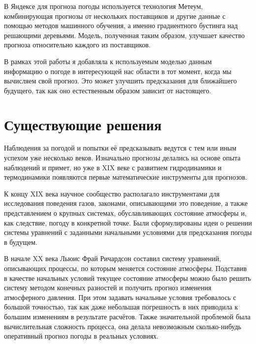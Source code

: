 \documentclass[14pt]{matmex-diploma}
\begin{document}
В Яндексе для прогноза погоды используется технология Метеум, комбинирующая прогнозы от нескольких поставщиков и другие данные с помощью методов машинного обучения, а именно градиентного бустинга над решающими деревьями. Модель, полученная таким образом, улучшает качество прогноза относительно каждого из поставщиков.

В рамках этой работы я добавляла к используемым моделью данным информацию о погоде в интересующей нас области в тот момент, когда мы вычисляем свой прогноз. Это может улучшить предсказания для ближайшего будущего, так как оно естественным образом зависит от настоящего.



\section{Существующие решения}




Наблюдения за погодой и попытки её предсказывать ведутся с тем или иным успехом уже несколько веков. Изначально прогнозы делались на основе опыта наблюдений и примет, но уже в XIX веке с развитием гидродинамики и термодинамики появляются первые математические инструменты для прогнозов. 

К концу XIX века научное сообщество располагало инструментами для исследования поведения газов, законами, описывающими это поведение, а также представлением о крупных системах, обуславливающих состояние атмосферы и, как следствие, погоду в конкретной точке. Были сформулированы идеи о решении системы уравнений с заданными начальными условиями для предсказания погоды в будущем.

В начале XX века Льюис Фрай Ричардсон составил систему уравнений, описывающих процессы, по которым меняется состояние атмосферы. Подставив в качестве начальных условий текущее состояние атмосферы можно было решить систему методом конечных разностей и получить прогноз изменения атмосферного давления\cite{lynch2008origins}. При этом задавать начальные условия требовалось с большой точностью, так как даже небольшая погрешность в них приводила к большим изменениям в результате расчётов. Также значительной проблемой была вычислительная сложность процесса, она делала невозможным сколько-нибудь оперативный прогноз погоды в реальных условиях.
\end{document}
